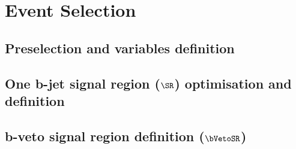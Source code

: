 \chapter{Event Selection}
\label{chapter:event_selection}

\section{Preselection and variables definition}
\section[One b-jet signal region (SR1b) optimisation and definition]{One b-jet signal region ($\SR$) optimisation and definition}
\section[b-veto signal region definition (SR0b)]{b-veto signal region definition ($\bVetoSR$)}